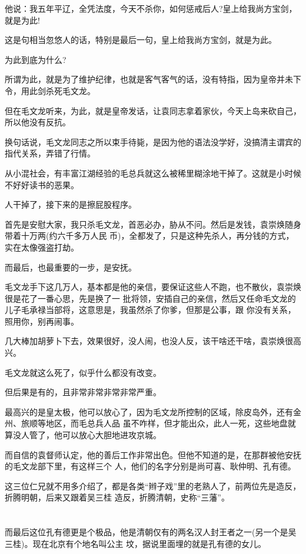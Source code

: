 \documentclass[11pt,a4paper,onecolumn]{article}
\begin{document}
他说：我五年平辽，全凭法度，今天不杀你，如何惩戒后人?皇上给我尚方宝剑，就是为此!

这是句相当忽悠人的话，特别是最后一句，皇上给我尚方宝剑，就是为此。

为此\myrule 到底为什么?

所谓为此，就是为了维护纪律，也就是客气客气的话，没有特指，因为皇帝并未下令，用此剑杀死毛文龙。

但在毛文龙听来，为此，就是皇帝发话，让袁同志拿着家伙，今天上岛来砍自己，所以他没有反抗。

换句话说，毛文龙同志之所以束手待毙，是因为他的语法没学好，没搞清主谓宾的指代关系，弄错了行情。

从小混社会，有丰富江湖经验的毛总兵就这么被稀里糊涂地干掉了。这就是小时候不好好读书的恶果。

人干掉了，接下来的是擦屁股程序。

首先是安慰大家，我只杀毛文龙，首恶必办，胁从不问。然后是发钱，袁崇焕随身带着十万两(约六千多万人民
币)，全都发了，只是这种先杀人，再分钱的方式，实在太像强盗打劫。

而最后，也最重要的一步，是安抚。

毛文龙手下这几万人，基本都是他的亲信，要保证这些人不跑，也不散伙，袁崇焕很是花了一番心思，先是换了一
批将领，安插自己的亲信，然后又任命毛文龙的儿子毛承禄当部将，这意思是，我虽然杀了你爹，但那是公事，跟
你没有关系，照用你，别再闹事。

几大棒加胡萝卜下去，效果很好，没人闹，也没人反，该干啥还干啥，袁崇焕很高兴。

毛文龙就这么死了，似乎什么都没有改变。

但后果是有的，且非常非常非常非常严重。

最高兴的是皇太极，他可以放心了，因为毛文龙所控制的区域，除皮岛外，还有金州、旅顺等地区，而毛总兵人品
虽不咋样，但才能出众，此人一死，这些地盘就算没人管了，他可以放心大胆地进攻京城。

而自信的袁督师认定，他的善后工作非常出色。但他不知道的是，在那群被他安抚的毛文龙部下里，有这样三个
人，他们的名字分别是尚可喜、耿仲明、孔有德。

这三位仁兄就不用多介绍了，都是各类``辫子戏''里的老熟人了，前两位先是造反，折腾明朝，后来又跟着吴三桂
造反，折腾清朝，史称``三藩''。

\section[\thesection]{}

而最后这位孔有德更是个极品，他是清朝仅有的两名汉人封王者之一(另一个是吴三桂)。现在北京有个地名叫公主
坟，据说里面埋的就是孔有德的女儿。
\end{document}
